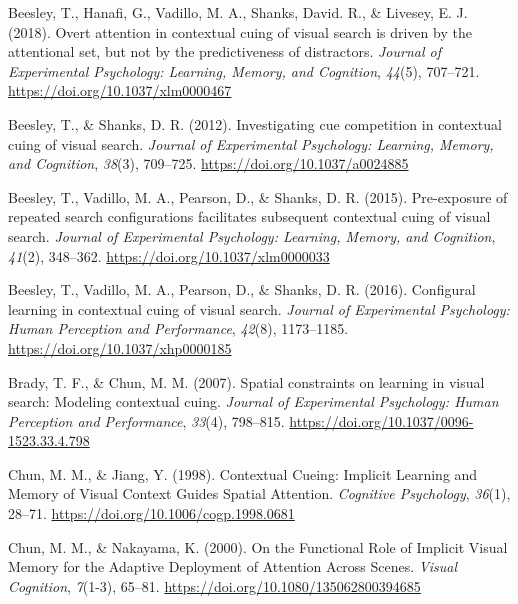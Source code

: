 \documentclass[
  man,floatsintext]{apa7}
\newlength{\cslhangindent}
\newlength{\cslentryspacingunit} %
\newenvironment{CSLReferences}[2] %
 {%
  \setlength{\parindent}{0pt}
  \ifodd #1
  \let\oldpar\par
  \def\par{\hangindent=\cslhangindent\oldpar}
  \fi
  \setlength{\parskip}{#2\cslentryspacingunit}
 }%
 {}
\begin{document}
\hypertarget{refs}{}
\begin{CSLReferences}{1}{0}
\leavevmode{}%
Beesley, T., Hanafi, G., Vadillo, M. A., Shanks, David. R., \& Livesey, E. J. (2018). Overt attention in contextual cuing of visual search is driven by the attentional set, but not by the predictiveness of distractors. \emph{Journal of Experimental Psychology: Learning, Memory, and Cognition}, \emph{44}(5), 707--721. \url{https://doi.org/10.1037/xlm0000467}

\leavevmode{}%
Beesley, T., \& Shanks, D. R. (2012). Investigating cue competition in contextual cuing of visual search. \emph{Journal of Experimental Psychology: Learning, Memory, and Cognition}, \emph{38}(3), 709--725. \url{https://doi.org/10.1037/a0024885}

\leavevmode{}%
Beesley, T., Vadillo, M. A., Pearson, D., \& Shanks, D. R. (2015). Pre-exposure of repeated search configurations facilitates subsequent contextual cuing of visual search. \emph{Journal of Experimental Psychology: Learning, Memory, and Cognition}, \emph{41}(2), 348--362. \url{https://doi.org/10.1037/xlm0000033}

\leavevmode{}%
Beesley, T., Vadillo, M. A., Pearson, D., \& Shanks, D. R. (2016). Configural learning in contextual cuing of visual search. \emph{Journal of Experimental Psychology: Human Perception and Performance}, \emph{42}(8), 1173--1185. \url{https://doi.org/10.1037/xhp0000185}

\leavevmode{}%
Brady, T. F., \& Chun, M. M. (2007). Spatial constraints on learning in visual search: {Modeling} contextual cuing. \emph{Journal of Experimental Psychology: Human Perception and Performance}, \emph{33}(4), 798--815. \url{https://doi.org/10.1037/0096-1523.33.4.798}

\leavevmode{}%
Chun, M. M., \& Jiang, Y. (1998). Contextual {Cueing}: {Implicit Learning} and {Memory} of {Visual Context Guides Spatial Attention}. \emph{Cognitive Psychology}, \emph{36}(1), 28--71. \url{https://doi.org/10.1006/cogp.1998.0681}

\leavevmode{}%
Chun, M. M., \& Nakayama, K. (2000). On the {Functional Role} of {Implicit Visual Memory} for the {Adaptive Deployment} of {Attention Across Scenes}. \emph{Visual Cognition}, \emph{7}(1-3), 65--81. \url{https://doi.org/10.1080/135062800394685}


\end{CSLReferences}
\end{document}
